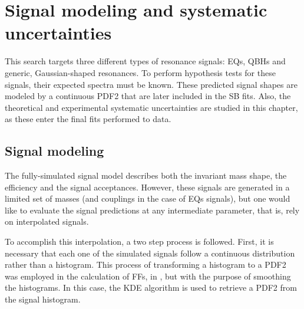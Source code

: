 \chapter{Signal modeling and systematic uncertainties}
\label{ch:signals}


This search targets three different types of \gammajet resonance signals: \acp{EQ}, \acp{QBH} and generic, Gaussian-shaped resonances. To perform hypothesis tests for these signals, their expected \myj spectra must be known.
These predicted signal shapes are modeled by a continuous \ac{PDF2} that are later included in the \ac{SB} fits.
Also, the theoretical and experimental systematic uncertainties are studied in this chapter, as these enter the final fits performed to data.







\section{Signal modeling}
\label{sec:signals:modeling}

The fully-simulated signal model describes both the invariant mass shape, the efficiency and the signal acceptances. However, these signals are generated in a limited set of masses (and couplings in the case of \acp{EQ} signals), but one would like to evaluate the signal predictions at any intermediate parameter, that is, rely on interpolated signals.

To accomplish this interpolation, a two step process is followed. First, it is necessary that each one of the simulated signals follow a continuous distribution rather than a histogram. This process of transforming a histogram to a \ac{PDF2} was employed in the calculation of \acp{FF}, in \Sect{\ref{subsec:ss_corrections:ffs:calculation}}, but with the purpose of smoothing the histograms. In this case, the \ac{KDE} algorithm is used to retrieve a \ac{PDF2} from the signal histogram.

